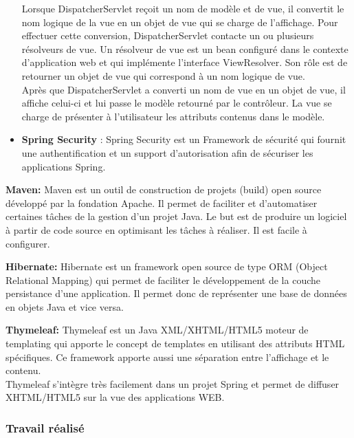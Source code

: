 \documentclass[12pt]{article}
\begin{document}
\begin{itemize}
Lorsque DispatcherServlet reçoit un nom de modèle et de vue, il convertit le nom logique de la vue en un objet de vue qui se charge de l’affichage. Pour effectuer cette conversion, DispatcherServlet contacte un ou plusieurs résolveurs de vue. Un résolveur de vue est un bean configuré dans le contexte d’application web et qui implémente
l’interface ViewResolver. Son rôle est de retourner un objet de vue qui correspond à un nom logique de vue.\\


Après que DispatcherServlet a converti un nom de vue en un objet de vue, il affiche celui-ci et lui passe le modèle retourné par le contrôleur. La vue se charge de présenter à l’utilisateur les attributs contenus dans le modèle.\\

	
	\item \textbf{Spring Security }: Spring Security est un Framework de sécurité  qui fournit une authentification et un support d’autorisation afin de sécuriser les applications Spring. \newline
\end{itemize} 

\textbf{Maven:} Maven est un outil de construction de projets (build) open source développé par la fondation Apache. Il permet de faciliter et d'automatiser certaines tâches de la gestion d'un projet Java. Le but est de produire un logiciel à partir de code source en optimisant les tâches à réaliser. Il est facile à configurer.\newline

\textbf{Hibernate: } Hibernate est un framework open source de type ORM (Object Relational Mapping) qui permet de faciliter le développement de la couche persistance d'une application. Il permet donc de représenter une base de données en objets Java et vice versa.

\textbf{Thymeleaf:} Thymeleaf est un Java XML/XHTML/HTML5 moteur de templating qui apporte le concept de templates en utilisant des attributs HTML spécifiques. Ce framework apporte aussi une séparation entre l'affichage et le contenu.\\

Thymeleaf s’intègre très facilement dans un projet Spring et permet de diffuser XHTML/HTML5 sur la vue des applications WEB.


\subsubsection{Travail réalisé}
\end{document}
